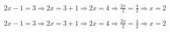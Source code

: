\begin{alist}
\item $ 2x-1=3\Rightarrow 2x=3+1\Rightarrow 2x=4\Rightarrow \frac{2x}{2}=\frac{4}{2}\Rightarrow x=2 $
\end{alist}
\begin{alist}
\item $ 2x-1=3\Rightarrow 2x=3+1\Rightarrow 2x=4\Rightarrow \frac{2x}{2}=\frac{4}{2}\Rightarrow x=2 $
\end{alist}
